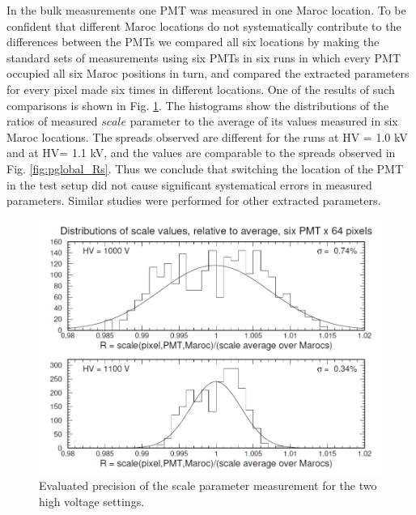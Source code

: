 In the bulk measurements one PMT was measured in one Maroc location. To be confident that different Maroc locations do not systematically contribute to the differences between the PMTs we compared all six locations by making the standard sets of measurements using six PMTs in six runs in which every PMT occupied all six Maroc positions in turn, and compared the extracted parameters for every pixel made six times in different locations. One of the results of such comparisons is shown in Fig. \ref{fig:R_scale_maroc_avg}. The histograms show the distributions of the ratios of measured $scale$ parameter to the average of its values measured in six Maroc locations. The spreads observed are different for the runs at HV = 1.0 kV and at HV= 1.1 kV, and the values are comparable to the spreads observed in Fig. \ref{fig:pglobal_Rs}. Thus we conclude that switching the location of the PMT in the test setup did not cause significant systematical errors in measured parameters. Similar studies were performed for other extracted parameters.
\begin{figure}[hbt]
	\centering
	\includegraphics[width=0.98\linewidth, trim=0 10 15 10, clip]{figures/R_scale_maroc_avg.png}
	\caption{Evaluated precision of the scale parameter measurement for the two high voltage settings.}
	\label{fig:R_scale_maroc_avg}
\end{figure}


